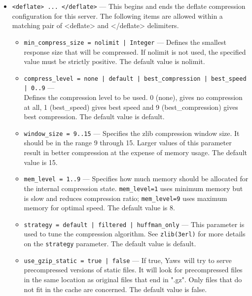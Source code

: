 \documentclass[11pt,oneside,english]{book}
\newcommand{\Yaws}            %
        {{\sc Yaws}}
\begin{document}
\begin{itemize}
\item       \verb+<deflate> ... </deflate>+ ---
             This begins and ends the deflate compression configuration for this
             server. The following items are allowed within a matching pair of
             <deflate> and </deflate> delimiters.

             \begin{itemize}
             \item \verb+min_compress_size = nolimit | Integer+ --- Defines the
               smallest response size that will be compressed. If nolimit is not
               used, the specified value must be strictly positive. The default
               value is nolimit.

             \item \verb+compress_level = none | default | best_compression | best_speed | 0..9+ ---\\
               Defines the compression level to be used. 0 (none), gives no
               compression at all, 1 (best\_speed) gives best speed and 9
               (best\_compression) gives best compression. The default value is
               default.

             \item \verb+window_size = 9..15+ --- Specifies the zlib compression
               window size. It should be in the range 9 through 15. Larger
               values of this parameter result in better compression at the
               expense of memory usage. The default value is 15.

             \item \verb+mem_level = 1..9+ --- Specifies how much memory should
               be allocated for the internal compression
               state. \verb+mem_level=1+ uses minimum memory but is slow and
               reduces compression ratio; \verb+mem_level=9+ uses maximum memory
               for optimal speed. The default value is 8.

             \item \verb+strategy = default | filtered | huffman_only+ --- This
               parameter is used to tune the compression algorithm. See
               \verb+zlib(3erl)+ for more details on the \verb+strategy+
               parameter. The default value is default.

             \item \verb+use_gzip_static = true | false+ --- If true,
               \Yaws\ will try to serve precompressed versions of static
               files. It will look for precompressed files in the same location
               as original files that end in ".gz". Only files that do not fit
               in the cache are concerned. The default value is false.


\end{itemize}
\end{itemize}
\end{document}
